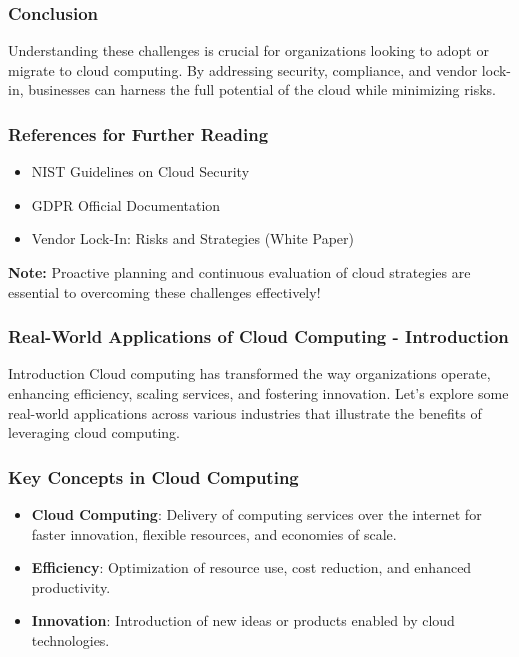\documentclass[aspectratio=169]{beamer}
\begin{document}
\begin{frame}[fragile]
    \frametitle{Conclusion}
    Understanding these challenges is crucial for organizations looking to adopt or migrate to cloud computing. By addressing security, compliance, and vendor lock-in, businesses can harness the full potential of the cloud while minimizing risks.
\end{frame}

\begin{frame}[fragile]
    \frametitle{References for Further Reading}
    \begin{itemize}
        \item NIST Guidelines on Cloud Security
        \item GDPR Official Documentation
        \item Vendor Lock-In: Risks and Strategies (White Paper)
    \end{itemize}
    \textbf{Note:} Proactive planning and continuous evaluation of cloud strategies are essential to overcoming these challenges effectively!
\end{frame}

\begin{frame}[fragile]
    \frametitle{Real-World Applications of Cloud Computing - Introduction}
    \begin{block}{Introduction}
        Cloud computing has transformed the way organizations operate, enhancing efficiency, scaling services, and fostering innovation. 
        Let's explore some real-world applications across various industries that illustrate the benefits of leveraging cloud computing.
    \end{block}
\end{frame}

\begin{frame}[fragile]
    \frametitle{Key Concepts in Cloud Computing}
    \begin{itemize}
        \item \textbf{Cloud Computing}: Delivery of computing services over the internet for faster innovation, flexible resources, and economies of scale.
        \item \textbf{Efficiency}: Optimization of resource use, cost reduction, and enhanced productivity.
        \item \textbf{Innovation}: Introduction of new ideas or products enabled by cloud technologies.
    \end{itemize}
\end{frame}
\end{document}
